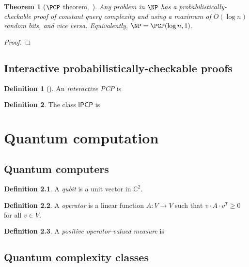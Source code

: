 \documentclass[english]{reedthesis}
\theoremstyle{plain}
\newtheorem{thm}{Theorem}[section]
\theoremstyle{definition}
\newtheorem{defn}[defn]{Definition}
\theoremstyle{remark}
\begin{document}
\begin{thm}[{$\PCP$ theorem,~\cite{AS98}}]\label{thm:pcp-theorem}
  Any problem in $\NP$ has a probabilistically-checkable proof of constant query
  complexity and using a maximum of $O(\log n)$ random bits, and vice versa.
  Equivalently, $\NP = \PCP(\log n, 1)$.
\end{thm}

\begin{proof}
\end{proof}

\section{Interactive probabilistically-checkable proofs}\label{sec:ipcp}

\begin{defn}[{\cite[]{KR08}}]\label{defn:ipcp}
  An \emph{interactive PCP} is %
\end{defn}

\begin{defn}\label{defn:ipcp-class}
  The class $\mathsf{IPCP}$ is %
\end{defn}

\chapter{Quantum computation}\label{chap:quantum}

\section{Quantum computers}\label{sec:quant-comp}

\begin{defn}\label{def:qubit}
  A \emph{qubit} is a unit vector in $\mathbb{C}^{2}$.
\end{defn}

\begin{defn}\label{def:operator}
  A \emph{operator} is a linear function $A: V \rightarrow V$ such that
  $v \cdot A \cdot v^{T} \ge 0$ for all $v \in V$.
\end{defn}

\begin{defn}\label{def:povm}
  A \emph{positive operator-valued measure} is
\end{defn}

\section{Quantum complexity classes}
\end{document}
